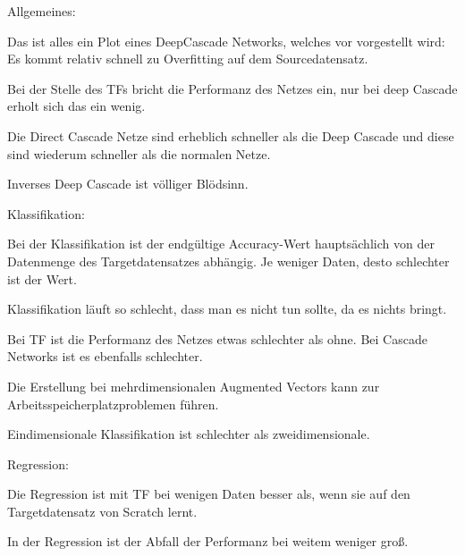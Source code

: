 Allgemeines:

Das ist alles ein Plot eines DeepCascade Networks, welches vor vorgestellt wird:
Es kommt relativ schnell zu Overfitting auf dem Sourcedatensatz. %

Bei der Stelle des TFs bricht die Performanz des Netzes ein, nur bei deep Cascade erholt sich das ein wenig. 


Die Direct Cascade Netze sind erheblich schneller als die Deep Cascade und diese sind wiederum schneller als die normalen Netze. 

Inverses Deep Cascade ist völliger Blödsinn. \newline

Klassifikation: 

Bei der Klassifikation ist der endgültige Accuracy-Wert hauptsächlich von der Datenmenge des Targetdatensatzes abhängig. 
Je weniger Daten, desto schlechter ist der Wert. %

Klassifikation läuft so schlecht, dass man es nicht tun sollte, da es nichts bringt. %

Bei TF ist die Performanz des Netzes etwas schlechter als ohne. %
Bei Cascade Networks ist es ebenfalls schlechter. %


Die Erstellung bei mehrdimensionalen Augmented Vectors kann zur Arbeitsspeicherplatzproblemen führen. %

Eindimensionale Klassifikation ist schlechter als zweidimensionale. \newline

Regression:

Die Regression ist mit TF bei wenigen Daten besser als, wenn sie auf den Targetdatensatz von Scratch lernt. %


In der Regression ist der Abfall der Performanz bei weitem weniger groß. %

